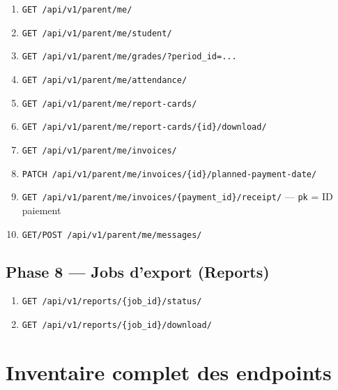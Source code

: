 \documentclass[11pt,a4paper]{article}
\begin{document}
\begin{enumerate}[noitemsep]
    \item \texttt{GET /api/v1/parent/me/}
    \item \texttt{GET /api/v1/parent/me/student/}
    \item \texttt{GET /api/v1/parent/me/grades/?period\_id=...}
    \item \texttt{GET /api/v1/parent/me/attendance/}
    \item \texttt{GET /api/v1/parent/me/report-cards/}
    \item \texttt{GET /api/v1/parent/me/report-cards/\{id\}/download/}
    \item \texttt{GET /api/v1/parent/me/invoices/}
    \item \texttt{PATCH /api/v1/parent/me/invoices/\{id\}/planned-payment-date/}
    \item \texttt{GET /api/v1/parent/me/invoices/\{payment\_id\}/receipt/} --- \texttt{pk} = ID paiement
    \item \texttt{GET/POST /api/v1/parent/me/messages/}
\end{enumerate}

\subsection{Phase 8 --- Jobs d'export (Reports)}
\begin{enumerate}[noitemsep]
    \item \texttt{GET /api/v1/reports/\{job\_id\}/status/}
    \item \texttt{GET /api/v1/reports/\{job\_id\}/download/}
\end{enumerate}

\section{Inventaire complet des endpoints}
\end{document}
